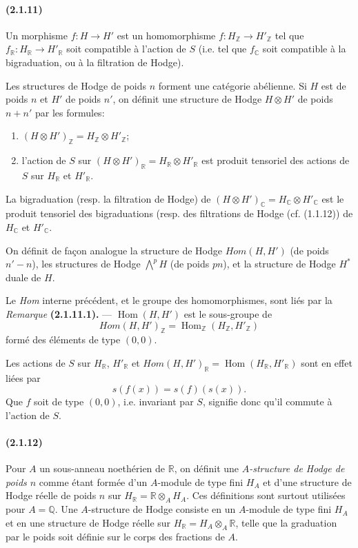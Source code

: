 \documentclass[10pt]{article}
\newcommand{\C}{\mathbb C}
\newcommand{\Q}{\mathbb Q}
\newcommand{\Z}{\mathbb Z}
\newcommand{\Hom}{\operatorname{Hom}}
\newcommand{\fg}{\guillemotright}
\newcommand{\og}{\guillemotleft}
\newcommand{\R}{\mathbb R}
\begin{document}
\paragraph{(2.1.11)} Un morphisme $f:H\to H'$ est un homomorphisme $f:H_\Z\to H'_\Z$ tel que $f_\R:H_\R\to H'_\R$ soit compatible à l'action de $S$ (i.e. tel que $f_\C$ soit compatible à la bigraduation, ou à la filtration de Hodge).

Les structures de Hodge de poids $n$ forment une catégorie abélienne. Si $H$ est de poids $n$ et $H'$ de poids $n'$, on définit une structure de Hodge $H\otimes H'$ de poids $n+n'$ par les formules:
\begin{enumerate}[label=\alph*)]
\item $(H\otimes H')_\Z=H_\Z\otimes H'_\Z$;
\item l'action de $S$ sur $(H\otimes H')_\R=H_\R\otimes H'_\R$ est produit tensoriel des actions de $S$ sur $H_\R$ et $H'_\R$.
\end{enumerate}
La bigraduation (resp. la filtration de Hodge) de $(H\otimes H')_\C=H_\C\otimes H'_\C$ est le produit tensoriel des bigraduations (resp. des filtrations de Hodge (cf. (1.1.12)) de $H_\C$ et $H'_\C$.

On définit de façon analogue la structure de Hodge $\mathit{Hom}(H,H')$ (de poids $n'-n$), les structures de Hodge $\bigwedge^p H$ (de poids $pn$), et la structure de Hodge $H^*$ duale de $H$.

Le \og \emph{Hom} interne\fg{} précédent, et le groupe des homomorphismes, sont liés par la \emph{Remarque} \textbf{(2.1.11.1).} --- $\Hom(H,H')$ est le sous-groupe de
\[
\mathit{Hom}(H,H')_\Z=\Hom_\Z(H_\Z,H'_\Z)
\]
formé des éléments de type $(0,0)$.

Les actions de $S$ sur $H_\R$, $H'_\R$ et $\mathit{Hom}(H,H')_\R=\Hom(H_\R,H'_\R)$ sont en effet liées par
\[
s(f(x))=s(f)(s(x)).
\]
Que $f$ soit de type $(0,0)$, i.e. invariant par $S$, signifie donc qu'il commute à l'action de $S$.

\paragraph{(2.1.12)} Pour $A$ un sous-anneau noethérien de $\R$, on définit une \emph{$A$-structure de Hodge de poids $n$} comme étant formée d'un $A$-module de type fini $H_A$ et d'une structure de Hodge réelle de poids $n$ sur $H_\R=\R\otimes_AH_A$. Ces définitions sont surtout utilisées pour $A=\Q$. Une $A$-structure de Hodge consiste en un $A$-module de type fini $H_A$ et en une structure de Hodge réelle sur $H_\R=H_A\otimes_A\R$, telle que la graduation par le poids soit définie sur le corps des fractions de $A$.
\end{document}
